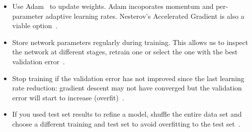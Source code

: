 \begin{itemize}
	\item Use Adam~\cite{Kingma2014} to update weights. Adam incoporates momentum and per-parameter adaptive learning rates. Nesterov's Accelerated Gradient is also a viable option~\cite{Karpathy2016}.

	\item Store network parameters regularly during training. This allows us to inspect the network at different stages, retrain one or select the one with the best validation error~\cite{Bengio2014}.

	\item Stop training if the validation error has not improved since the last learning rate reduction: gradient descent may not have converged but the validation error will start to increase (overfit)~\cite{Bengio2012}.

	\item If you used test set results to refine a model, shuffle the entire data set and choose a different training and test set to avoid overfitting to the test set~\cite{Ng2014}.
\end{itemize}


